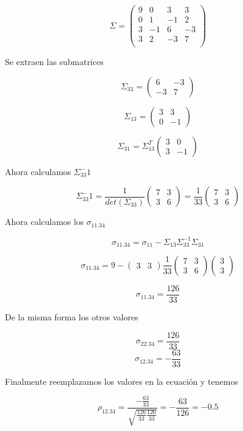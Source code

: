 $$
\Sigma=
\begin{pmatrix}
9 & 0 & 3 & 3 \\
0 & 1 & -1 & 2 \\
3 & -1 & 6 & -3 \\
3 & 2 & -3 & 7 \\
\end{pmatrix}
$$

Se extraen las submatrices

$$
\Sigma_{33}=
\begin{pmatrix}
6 & -3 \\
-3 & 7
\end{pmatrix}
$$

$$
\Sigma_{13}=
\begin{pmatrix}
3 & 3 \\
0 & -1
\end{pmatrix}
$$

$$
\Sigma_{31}=\Sigma_{13}^T
\begin{pmatrix}
3 & 0 \\
3 & -1
\end{pmatrix}
$$

Ahora calculamos $\Sigma_{33}^-1$

$$
\Sigma_{33}^-1 = \frac{1}{det(\Sigma_{33})}
\begin{pmatrix}
7 & 3 \\
3 & 6
\end{pmatrix} = \frac{1}{33}
\begin{pmatrix}
7 & 3 \\
3 & 6
\end{pmatrix}
$$

Ahora calculamos los $\sigma_{11.34}$

$$
\sigma_{11.34} = \sigma_{11} - \Sigma_{13} \Sigma_{33}^{-1} \Sigma_{31}
$$

$$
\sigma_{11.34} = 9 - 
\begin{pmatrix}
3 & 3
\end{pmatrix} \frac{1}{33}
\begin{pmatrix}
7 & 3 \\
3 & 6
\end{pmatrix}
\begin{pmatrix}
3 \\
3
\end{pmatrix}
$$

$$
\sigma_{11.34} = \frac{126}{33}
$$

De la misma forma los otros valores

$$
\sigma_{22.34} = \frac{126}{33}
$$
$$
\sigma_{12.34} = -\frac{63}{33}
$$

Finalmente reemplazamos los valores en la ecuación y tenemos

$$
\rho_{12.34} = \frac{-\frac{63}{33}}{\sqrt{\frac{126}{33}\frac{126}{33}}} = -\frac{63}{126} = -0.5
$$















